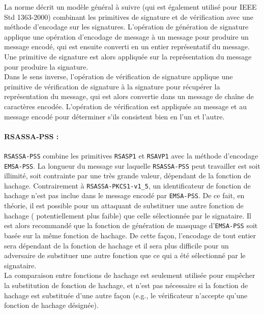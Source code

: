La norme décrit un modèle général à suivre (qui est également utilisé pour IEEE Std 1363-2000) combinant les primitives de signature et de vérification avec une méthode d'encodage sur les signatures. L'opération de génération de signature applique une opération d'encodage de message à un message pour produire un message encodé, qui est ensuite converti en un entier représentatif du message. Une primitive de signature est alors appliquée sur la représentation du message pour produire la signature.\\ 


Dans le sens inverse, l'opération de vérification de signature applique une primitive de vérification de signature à la signature pour récupérer la représentation du message, qui est alors convertie dans un message de chaîne de caractères encodée. L'opération de vérification est appliquée au message et au message encodé pour déterminer s'ils  consistent bien en  l'un et l'autre.\\ 


\paragraph{RSASSA-PSS : \\}
\texttt{RSASSA-PSS} combine les primitives \texttt{RSASP1} et \texttt{RSAVP1} avec la méthode d'encodage \texttt{EMSA-PSS}. La longueur du message sur laquelle \texttt{RSASSA-PSS} peut travailler est soit illimité, soit contrainte par une très grande valeur, dépendant de la fonction de hachage. Contrairement à \texttt{RSASSA-PKCS1-v1\_5}, un identificateur de fonction de hachage n'est pas inclue dans le message encodé par \texttt{EMSA-PSS}. De ce fait, en théorie, il est possible pour un attaquant de substituer une autre fonction de hachage ( potentiellement plus faible) que celle sélectionnée par le signataire. Il est alors recommandé que la fonction de génération de masquage d'\texttt{EMSA-PSS}  soit basée sur la même fonction de hachage. De cette façon, l'encodage de tout entier sera dépendant de la fonction de hachage et il sera plus difficile pour un adversaire de substituer une autre fonction que ce qui a été sélectionné par le signataire.\\


La comparaison entre fonctions de hachage est seulement utilisée pour empêcher la substitution de fonction de hachage, et n'est pas nécessaire si la fonction de hachage est substituée d'une autre façon (e.g., le vérificateur n'accepte qu'une fonction de hachage désignée).\\ 


